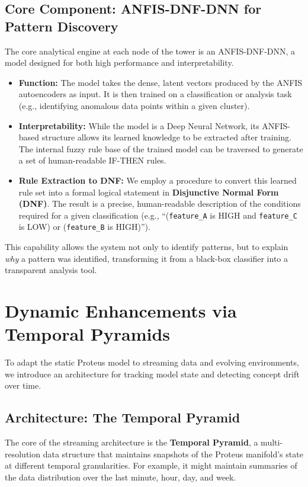 \documentclass{article}
\begin{document}
\subsection{Core Component: ANFIS-DNF-DNN for Pattern Discovery}
The core analytical engine at each node of the tower is an ANFIS-DNF-DNN, a model designed for both high performance and interpretability.
\begin{itemize}
    \item \textbf{Function:} The model takes the dense, latent vectors produced by the ANFIS autoencoders as input. It is then trained on a classification or analysis task (e.g., identifying anomalous data points within a given cluster).
    \item \textbf{Interpretability:} While the model is a Deep Neural Network, its ANFIS-based structure allows its learned knowledge to be extracted after training. The internal fuzzy rule base of the trained model can be traversed to generate a set of human-readable IF-THEN rules.
    \item \textbf{Rule Extraction to DNF:} We employ a procedure to convert this learned rule set into a formal logical statement in \textbf{Disjunctive Normal Form (DNF)}. The result is a precise, human-readable description of the conditions required for a given classification (e.g., ``(\texttt{feature\_A} is HIGH and \texttt{feature\_C} is LOW) or (\texttt{feature\_B} is HIGH)'').
\end{itemize}
This capability allows the system not only to identify patterns, but to explain \textit{why} a pattern was identified, transforming it from a black-box classifier into a transparent analysis tool.

\section{Dynamic Enhancements via Temporal Pyramids}

To adapt the static Proteus model to streaming data and evolving environments, we introduce an architecture for tracking model state and detecting concept drift over time.

\subsection{Architecture: The Temporal Pyramid}
The core of the streaming architecture is the \textbf{Temporal Pyramid}, a multi-resolution data structure that maintains snapshots of the Proteus manifold's state at different temporal granularities. For example, it might maintain summaries of the data distribution over the last minute, hour, day, and week.
\end{document}
